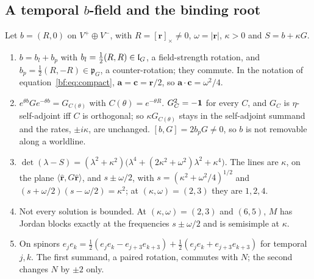 \subsection{A temporal \texorpdfstring{$b$}{b}-field and the binding root}
\label{e6:sec:binding}

\begin{proposition}
\label{e6:prop:binding}
Let $b=(R,0)$ on $V^+\oplus V^-$, with $R=[\mathbf r]_\times\neq0$, $\omega=|\mathbf r|$, $\kappa>0$ and $S=b+\kappa G$.
\begin{enumerate}[label=(\roman*),leftmargin=2.2em]
\item $b=b_l+b_p$ with $b_l=\tfrac12(R,R)\in\mathfrak l_G$, a field-strength rotation, and $b_p=\tfrac12(R,-R)\in\mathfrak p_G$, a counter-rotation; they commute. In
the notation of equation~\cref{bf:eq:compact}, $\mathbf a=\mathbf c=\mathbf r/2$, so $\mathbf a\cdot\mathbf c=\omega^2/4$.
\item $e^{\theta b}Ge^{-\theta b}=G_{C(\theta)}$ with $C(\theta)=e^{-\theta R}$. $G_C^2=-\mathbf 1$ for every $C$, and $G_C$ is $\eta$-self-adjoint iff $C$ is
orthogonal; so $\kappa G_{C(\theta)}$ stays in the self-adjoint summand and the rates, $\pm i\kappa$, are unchanged. $[b,G]=2b_pG\neq0$, so $b$ is not removable along a worldline.
\item $\det(\lambda-S)=(\lambda^2+\kappa^2)\bigl(\lambda^4+(2\kappa^2+\omega^2)\lambda^2+\kappa^4\bigr)$. The lines are $\kappa$, on the plane
$\langle\hat{\mathbf r},G\hat{\mathbf r}\rangle$, and $s\pm\omega/2$, with $s=(\kappa^2+\omega^2/4)^{1/2}$ and $(s+\omega/2)(s-\omega/2)=\kappa^2$; at $(\kappa,\omega)=(2,3)$
they are $1,2,4$.
\item Not every solution is bounded. At $(\kappa,\omega)=(2,3)$ and $(6,5)$, $M$ has Jordan blocks exactly at the frequencies $s\pm\omega/2$ and is
semisimple at $\kappa$.
\item On spinors $e_je_k=\tfrac12(e_je_k-e_{j+3}e_{k+3})+\tfrac12(e_je_k+e_{j+3}e_{k+3})$ for temporal $j,k$. The first summand, a paired rotation, commutes with
$N$; the second changes $N$ by $\pm2$ only.
\end{enumerate}
\end{proposition}

